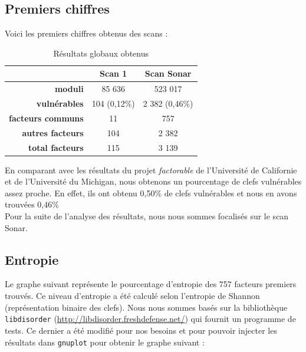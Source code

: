 \subsection{Premiers chiffres}
Voici les premiers chiffres obtenus des scans :


\begin{table}[H]
\centering
\begin{tabular}{|r|c|c|}
\hline
\textbf{}&\textbf{Scan 1}&\textbf{Scan Sonar}\\
\hline
\textbf{moduli}&85 636&523 017\\
\hline
\textbf{vulnérables}&104 (0,12\%)&2 382 (0,46\%)\\
\hline
\textbf{facteurs communs}&11&757\\
\hline
\textbf{autres facteurs}&104&2 382\\
\hline
\textbf{total facteurs}&115&3 139\\
\hline
\end{tabular}

\caption{Résultats globaux obtenus}
\label{res}
\end{table}

En comparant avec les résultats du projet \textit{factorable} de l'Université de Californie et de l'Université du Michigan, nous obtenons un pourcentage de clefs vulnérables assez proche. En effet, ils ont obtenu 0,50\% de clefs vulnérables et nous en avons trouvées 0,46\% \\


Pour la suite de l'analyse des résultats, nous nous sommes focalisés sur le scan Sonar.

\subsection{Entropie}
Le graphe suivant représente le pourcentage d'entropie des 757 facteurs premiers trouvés. Ce niveau d'entropie a été calculé selon l'entropie de Shannon (représentation binaire des clefs). Nous nous sommes basés sur la bibliothèque \verb+libdisorder+ (\url{http://libdisorder.freshdefense.net/}) qui fournit un programme de tests. Ce dernier a été modifié pour nos besoins et pour pouvoir injecter les résultats dans \texttt{gnuplot} pour obtenir le graphe suivant :

